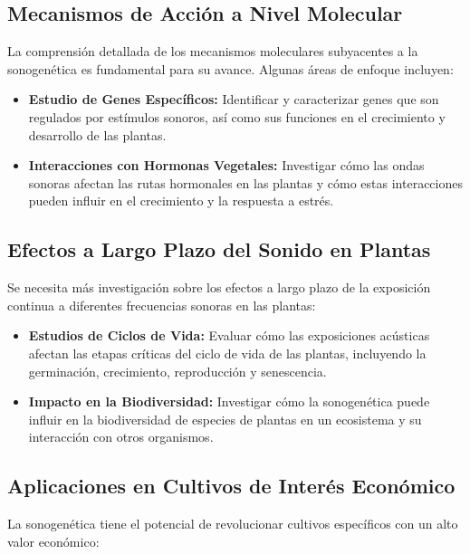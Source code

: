 \documentclass[twocolumn]{article}
\begin{document}
\subsection{Mecanismos de Acción a Nivel Molecular}

La comprensión detallada de los mecanismos moleculares subyacentes a la sonogenética es fundamental para su avance. Algunas áreas de enfoque incluyen:

\begin{itemize}
    \item \textbf{Estudio de Genes Específicos:} Identificar y caracterizar genes que son regulados por estímulos sonoros, así como sus funciones en el crecimiento y desarrollo de las plantas.
    
    \item \textbf{Interacciones con Hormonas Vegetales:} Investigar cómo las ondas sonoras afectan las rutas hormonales en las plantas y cómo estas interacciones pueden influir en el crecimiento y la respuesta a estrés.
\end{itemize}

\subsection{Efectos a Largo Plazo del Sonido en Plantas}

Se necesita más investigación sobre los efectos a largo plazo de la exposición continua a diferentes frecuencias sonoras en las plantas:

\begin{itemize}
    \item \textbf{Estudios de Ciclos de Vida:} Evaluar cómo las exposiciones acústicas afectan las etapas críticas del ciclo de vida de las plantas, incluyendo la germinación, crecimiento, reproducción y senescencia.
    
    \item \textbf{Impacto en la Biodiversidad:} Investigar cómo la sonogenética puede influir en la biodiversidad de especies de plantas en un ecosistema y su interacción con otros organismos.
\end{itemize}

\subsection{Aplicaciones en Cultivos de Interés Económico}

La sonogenética tiene el potencial de revolucionar cultivos específicos con un alto valor económico:
\end{document}
